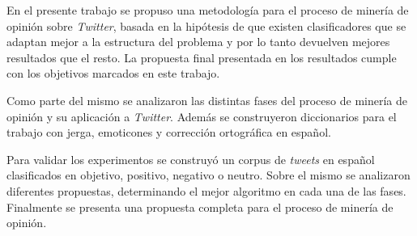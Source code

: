 \begin{conclusions}
En el presente trabajo se propuso una metodología para 
el proceso de minería de opinión sobre \emph{Twitter}, basada en la hipótesis 
de que existen clasificadores que se adaptan mejor a la estructura del
problema y por lo tanto devuelven mejores resultados que el resto.
La propuesta final presentada en los resultados cumple con 
los objetivos marcados en este trabajo.

Como parte del mismo se analizaron las distintas fases del 
proceso de minería de opinión y su aplicación a \emph{Twitter}.
Además se construyeron diccionarios para el trabajo con jerga, emoticones
y corrección ortográfica en español.

Para validar los experimentos se construyó un corpus de \emph{tweets} en español
clasificados en objetivo, positivo, negativo o neutro. 
Sobre el mismo se analizaron diferentes propuestas,
determinando el mejor algoritmo en cada una de las fases. Finalmente
se presenta una propuesta completa para el proceso de minería de opinión.

\end{conclusions}